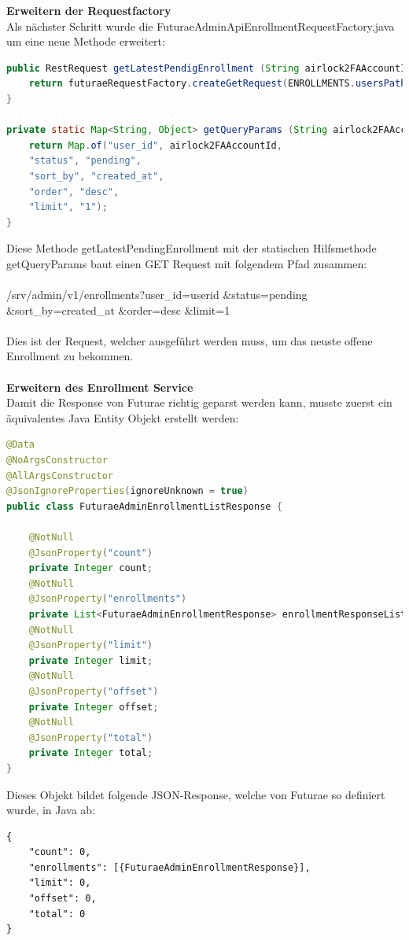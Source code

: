 \newpage
\noindent\textbf{Erweitern der Requestfactory}\\
Als nächster Schritt wurde die FuturaeAdminApiEnrollmentRequestFactory.java um eine neue Methode erweitert:
\begin{lstlisting}[language=Java]
public RestRequest getLatestPendigEnrollment (String airlock2FAAccountId) {
	return futuraeRequestFactory.createGetRequest(ENROLLMENTS.usersPath(), getQueryParams(airlock2FAAccountId));
}

private static Map<String, Object> getQueryParams (String airlock2FAAccountId) {
	return Map.of("user_id", airlock2FAAccountId,
	"status", "pending",
	"sort_by", "created_at",
	"order", "desc",
	"limit", "1");
}
\end{lstlisting}
Diese Methode \flqq getLatestPendingEnrollment\frqq{} mit der statischen Hilfsmethode \flqq getQueryParams \frqq{} baut einen GET Request mit folgendem Pfad zusammen:\\\\
/srv/admin/v1/enrollments?user\_id={userid}
\newline\&status=pending 
\newline\&sort\_by=created\_at 
\newline\&order=desc
\newline\&limit=1\\\\
Dies ist der Request, welcher ausgeführt werden muss, um das neuste offene Enrollment zu bekommen.\\\\
\textbf{Erweitern des Enrollment Service}\\
Damit die Response von Futurae richtig geparst werden kann, musste zuerst ein äquivalentes Java Entity Objekt erstellt werden:
\begin{lstlisting}[language=Java]
@Data
@NoArgsConstructor
@AllArgsConstructor
@JsonIgnoreProperties(ignoreUnknown = true)
public class FuturaeAdminEnrollmentListResponse {
	
	@NotNull
	@JsonProperty("count")
	private Integer count;
	@NotNull
	@JsonProperty("enrollments")
	private List<FuturaeAdminEnrollmentResponse> enrollmentResponseList;
	@NotNull
	@JsonProperty("limit")
	private Integer limit;
	@NotNull
	@JsonProperty("offset")
	private Integer offset;
	@NotNull
	@JsonProperty("total")
	private Integer total;
}
\end{lstlisting}
Dieses Objekt bildet folgende JSON-Response, welche von Futurae so definiert wurde, in Java ab:
\begin{verbatim}
{
	"count": 0,
	"enrollments": [{FuturaeAdminEnrollmentResponse}],
	"limit": 0,
	"offset": 0,
	"total": 0
}
\end{verbatim}
